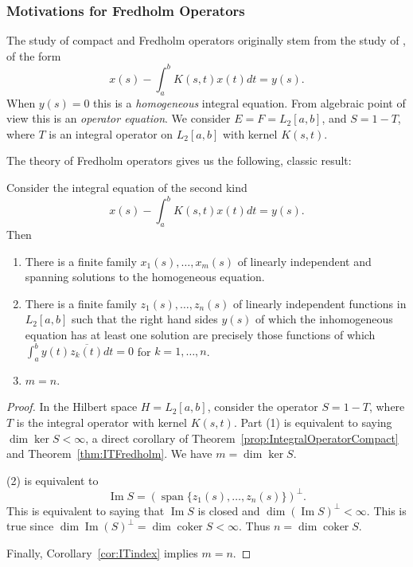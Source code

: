 \subsubsection{Motivations for Fredholm Operators}

The study of compact and Fredholm operators originally stem from the study of , of the form
\[
	x(s) - \int _a^b K(s, t) x(t) dt = y(s)
.\] 
When $y(s) = 0$ this is a \textit{homogeneous} integral equation. From algebraic point of view this is an \textit{operator equation}. We consider $E = F = L_2[a,b]$, and $S = 1 - T$, where $T$ is an integral operator on $L_2[a,b] $ with kernel $K(s, t)$. 

The theory of Fredholm operators gives us the following, classic result:

\begin{theorem}
	\label{thm:TripleFredholmThm}
	Consider the integral equation of the second kind
\[
	x(s) - \int _a^b K(s, t) x(t) dt = y(s)
.\]
Then
\begin{enumerate}
	\item There is a finite family $x_1(s), \ldots, x_m(s)$ of linearly independent and spanning solutions to the homogeneous equation.
	\item There is a finite family $z_1(s), \ldots, z_n(s)$ of linearly independent functions in $L_2[a,b]$ such that the right hand sides $y(s)$ of which the inhomogeneous equation has at least one solution are precisely those functions of which $\int _a^b y(t) \overline{z_k(t)} dt = 0 $ for $k = 1, \ldots, n$.
	\item $m = n$.
\end{enumerate}

\end{theorem}
\begin{proof}
	In the Hilbert space $H = L_2[a,b]$, consider the operator $S = 1 - T$, where $T$ is the integral operator with kernel $K(s, t)$. Part (1) is equivalent to saying  $\operatorname{dim} \operatorname{ker} S  < \infty $, a direct corollary of Theorem~\ref{prop:IntegralOperatorCompact} and Theorem~\ref{thm:ITFredholm}. We have $m = \operatorname{dim} \operatorname{ker} S$.

	(2) is equivalent to
	\[
		\operatorname{Im} S = \left( \operatorname{span } \{z_1(s), \ldots, z_n(s)\}  \right) ^\perp 
	.\] 
	This is equivalent to saying that $\operatorname{Im} S$ is closed and $\operatorname{dim} (\operatorname{Im} S) ^{\perp} < \infty $. This is true since $\operatorname{dim} \operatorname{Im} (S) ^\perp =\operatorname{dim} \operatorname{coker} S < \infty  $. Thus $n = \operatorname{dim} \operatorname{coker} S$.

	Finally, Corollary~\ref{cor:ITindex} implies $m = n$.
\end{proof}

